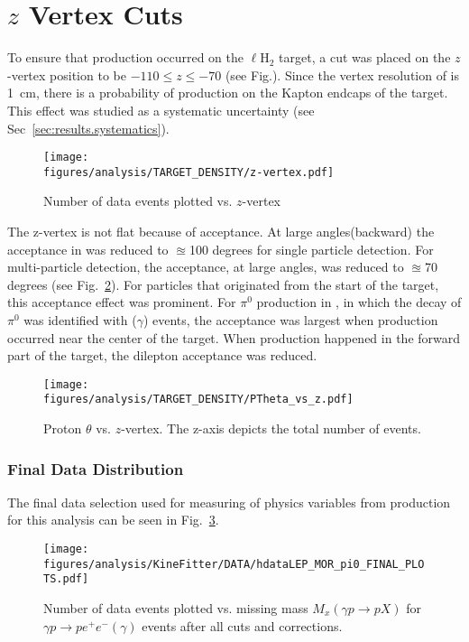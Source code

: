 \FloatBarrier
\section{$z$ Vertex Cuts}\label{sec:analysis.zvert}
To ensure that \pizT production occurred on the $\ell$H$_2$ target, a cut was placed on the $z$-vertex position to be $-110 \le z \le -70$ (see Fig.). Since the vertex resolution of  is 1~cm, there is a probability of \pizT production on the Kapton endcaps of the target. This effect was studied as a systematic uncertainty (see Sec~\ref{sec:results.systematics}). 
\begin{figure}[h!]\begin{center}
\texttt{[image: \\figures/analysis/TARGET\_DENSITY/z-vertex.pdf]}
\caption[Number of data events plotted vs. $z$-vertex]{\label{fig:zcut}Number of data events plotted vs. $z$-vertex}
\end{center}\end{figure}
The z-vertex is not flat because of acceptance. At large angles(backward) the acceptance in  was reduced to $\approxeq$100 degrees for single particle detection. For multi-particle detection, the acceptance, at large angles, was reduced to $\approxeq$70 degrees (see Fig.~\ref{fig:Ptheta_z}). For particles that originated from the start of the target, this acceptance effect was prominent. For $\pi^0$ production in , in which the decay of $\pi^0$ was identified with \epem($\gamma$) events, the acceptance was largest when production occurred near the center of the target. When production happened in the forward part of the target, the dilepton acceptance was reduced. 

\begin{figure}[h!]\begin{center}
\texttt{[image: \\figures/analysis/TARGET\_DENSITY/PTheta\_vs\_z.pdf]}
\caption[Proton $\theta$ vs. $z$-vertex]{\label{fig:Ptheta_z}Proton $\theta$ vs. $z$-vertex. The z-axis depicts the total number of events.}
\end{center}\end{figure}
\FloatBarrier
\subsubsection{Final Data Distribution}\label{sec.final.data}
The final data selection used for measuring of physics variables from \pizT production for this analysis can be seen in Fig.~\ref{fig:kinfit.final.plot}.

\begin{figure}[h!]\begin{center}
\texttt{[image: \\figures/analysis/KineFitter/DATA/hdataLEP\_MOR\_pi0\_FINAL\_PLOTS.pdf]}
\caption[Number of data events plotted vs. missing mass $M_x(\gamma p \to p X)$ for $\gamma p \to p e^+ e^- (\gamma)$ events after all cuts and corrections.]{\label{fig:kinfit.final.plot}Number of data events plotted vs. missing mass $M_x(\gamma p \to p X)$ for $\gamma p \to p e^+ e^- (\gamma)$ events after all cuts and corrections.}
\end{center}\end{figure}
\FloatBarrier
